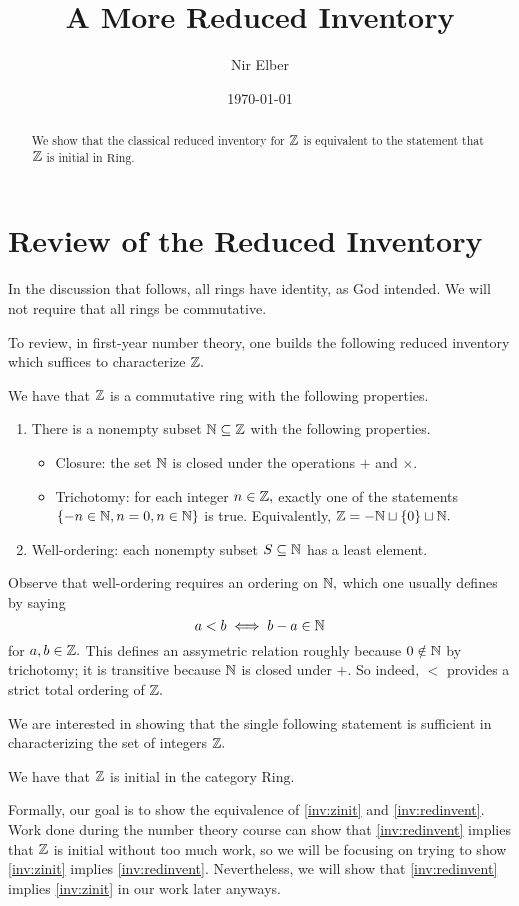 \documentclass{article}
\title{A More Reduced Inventory}
\author{Nir Elber}
\date{\today}
\begin{document}
\maketitle

\begin{abstract}
	We show that the classical reduced inventory for $\mathbb Z$ is equivalent to the statement that $\mathbb Z$ is initial in $\mathrm{Ring}.$
\end{abstract}

\toctrue
\tableofcontents
\tocfalse

\newpage

\section{Review of the Reduced Inventory}
In the discussion that follows, all rings have identity, as God intended. We will not require that all rings be commutative.

To review, in first-year number theory, one builds the following reduced inventory which suffices to characterize $\mathbb Z.$
\begin{inv} \label{inv:redinvent}
	We have that $\mathbb Z$ is a commutative ring with the following properties.
	\begin{enumerate}
		\item There is a nonempty subset $\mathbb N\subseteq\mathbb Z$ with the following properties.
		\begin{itemize}
			\item Closure: the set $\mathbb N$ is closed under the operations $+$ and $\times.$
			\item Trichotomy: for each integer $n\in\mathbb Z,$ exactly one of the statements $\{-n\in\mathbb N,n=0,n\in\mathbb N\}$ is true. Equivalently, $\mathbb Z=-\mathbb N\sqcup\{0\}\sqcup\mathbb N.$
		\end{itemize}
		\item Well-ordering: each nonempty subset $S\subseteq\mathbb N$ has a least element.
	\end{enumerate}
\end{inv}
Observe that well-ordering requires an ordering on $\mathbb N,$ which one usually defines by saying
\[a<b\iff b-a\in\mathbb N\]
for $a,b\in\mathbb Z.$ This defines an assymetric relation roughly because $0\notin\mathbb N$ by trichotomy; it is transitive because $\mathbb N$ is closed under $+.$ So indeed, $<$ provides a strict total ordering of $\mathbb Z.$

We are interested in showing that the single following statement is sufficient in characterizing the set of integers $\mathbb Z.$
\begin{inv} \label{inv:zinit}
	We have that $\mathbb Z$ is initial in the category $\mathrm{Ring}.$
\end{inv}
Formally, our goal is to show the equivalence of \autoref{inv:zinit} and \autoref{inv:redinvent}. Work done during the number theory course can show that \autoref{inv:redinvent} implies that $\mathbb Z$ is initial without too much work, so we will be focusing on trying to show \autoref{inv:zinit} implies \autoref{inv:redinvent}. Nevertheless, we will show that \autoref{inv:redinvent} implies \autoref{inv:zinit} in our work later anyways.
\end{document}
